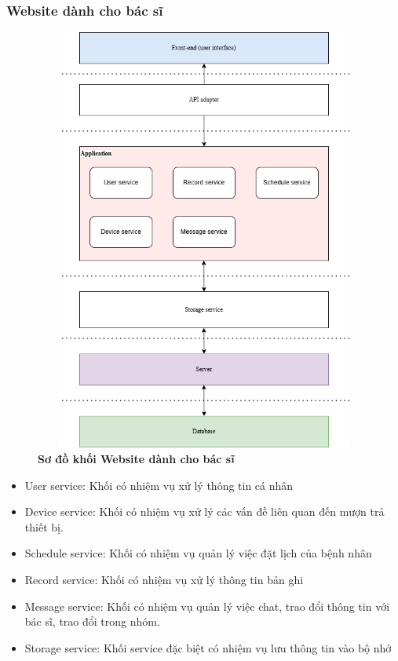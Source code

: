 \subsubsection{Website dành cho bác sĩ}
\begin{figure}[H]
  \centering
  \includegraphics[width=12cm,height=14cm]{Images/System/fmECG_architecture-Doctors.drawio.png}
  \caption[Sơ đồ khối Website dành cho bác sĩ]{\bfseries \fontsize{12pt}{0pt}\selectfont Sơ đồ khối Website dành cho bác sĩ}
  \label{fmECG_architecture-Doctor} %
\end{figure}
\begin{adjustwidth}{1.5em}{}
  \begin{itemize}
    \item User service: Khối có nhiệm vụ xử lý thông tin cá nhân
    \item Device service: Khối có nhiệm vụ xử lý các vấn đề liên quan đến mượn trả thiết bị.
    \item Schedule service: Khối có nhiệm vụ quản lý việc đặt lịch của bệnh nhân
    \item Record service: Khối có nhiệm vụ xử lý thông tin bản ghi
    \item Message service: Khối có nhiệm vụ quản lý việc chat, trao đổi thông tin với bác sĩ,
    trao đổi trong nhóm.
    \item Storage service: Khối service đặc biệt có nhiệm vụ lưu thông tin vào bộ nhớ
  \end{itemize}
\end{adjustwidth}


